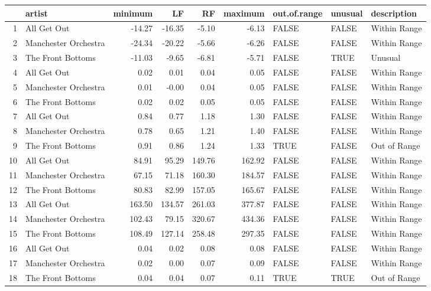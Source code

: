 \documentclass{article}\usepackage[]{graphicx}\usepackage[]{xcolor}
\begin{document}
\begin{table}[H]
\centering
\begin{tabular}{rlrrrrlll}
  \hline
 & artist & minimum & LF & RF & maximum & out.of.range & unusual & description \\ 
  \hline
1 & All Get Out & -14.27 & -16.35 & -5.10 & -6.13 & FALSE & FALSE & Within Range \\ 
  2 & Manchester Orchestra & -24.34 & -20.22 & -5.66 & -6.26 & FALSE & FALSE & Within Range \\ 
  3 & The Front Bottoms & -11.03 & -9.65 & -6.81 & -5.71 & FALSE & TRUE & Unusual \\ 
  4 & All Get Out & 0.02 & 0.01 & 0.04 & 0.05 & FALSE & FALSE & Within Range \\ 
  5 & Manchester Orchestra & 0.01 & -0.00 & 0.04 & 0.05 & FALSE & FALSE & Within Range \\ 
  6 & The Front Bottoms & 0.02 & 0.02 & 0.05 & 0.05 & FALSE & FALSE & Within Range \\ 
  7 & All Get Out & 0.84 & 0.77 & 1.18 & 1.30 & FALSE & FALSE & Within Range \\ 
  8 & Manchester Orchestra & 0.78 & 0.65 & 1.21 & 1.40 & FALSE & FALSE & Within Range \\ 
  9 & The Front Bottoms & 0.91 & 0.86 & 1.24 & 1.33 & TRUE & FALSE & Out of Range \\ 
  10 & All Get Out & 84.91 & 95.29 & 149.76 & 162.92 & FALSE & FALSE & Within Range \\ 
  11 & Manchester Orchestra & 67.15 & 71.18 & 160.30 & 184.57 & FALSE & FALSE & Within Range \\ 
  12 & The Front Bottoms & 80.83 & 82.99 & 157.05 & 165.67 & FALSE & FALSE & Within Range \\ 
  13 & All Get Out & 163.50 & 134.57 & 261.03 & 377.87 & FALSE & FALSE & Within Range \\ 
  14 & Manchester Orchestra & 102.43 & 79.15 & 320.67 & 434.36 & FALSE & FALSE & Within Range \\ 
  15 & The Front Bottoms & 108.49 & 127.14 & 258.48 & 297.35 & FALSE & FALSE & Within Range \\ 
  16 & All Get Out & 0.04 & 0.02 & 0.08 & 0.08 & FALSE & FALSE & Within Range \\ 
  17 & Manchester Orchestra & 0.02 & 0.00 & 0.07 & 0.09 & FALSE & FALSE & Within Range \\ 
  18 & The Front Bottoms & 0.04 & 0.04 & 0.07 & 0.11 & TRUE & TRUE & Out of Range \\ 

\end{tabular}
\end{table}
\end{document}
